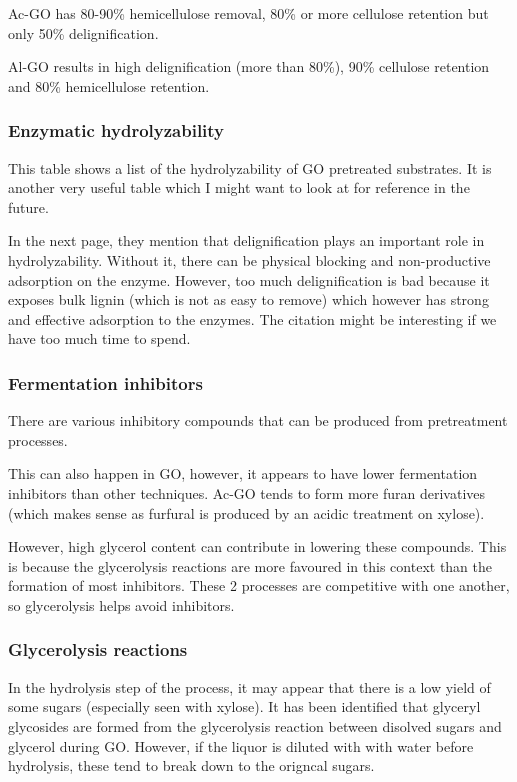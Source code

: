 \documentclass[11pt]{article}
\begin{document}
Ac-GO has 80-90\% hemicellulose removal, 80\% or more cellulose retention but only 50\% delignification.

Al-GO results in high delignification (more than 80\%), 90\% cellulose retention and 80\% hemicellulose retention.
\subsubsection{Enzymatic hydrolyzability}
\label{sec:org2b78a0d}
This table shows a list of the hydrolyzability of GO pretreated substrates. It is another very useful table which I might want to look at for reference in the future.

In the next page, they mention that delignification plays an important role in hydrolyzability. Without it, there can be physical blocking and non-productive adsorption on the enzyme. However, too much delignification is bad because it exposes bulk lignin (which is not as easy to remove) which however has strong and effective adsorption to the enzymes. The citation might be interesting if we have too much time to spend.
\subsubsection{Fermentation inhibitors}
\label{sec:orgf32981b}
There are various inhibitory compounds that can be produced from pretreatment processes.

This can also happen in GO, however, it appears to have lower fermentation inhibitors than other techniques. Ac-GO tends to form more furan derivatives (which makes sense as furfural is produced by an acidic treatment on xylose).

However, high glycerol content can contribute in lowering these compounds. This is because the glycerolysis reactions are more favoured in this context than the formation of most inhibitors. These 2 processes are competitive with one another, so glycerolysis helps avoid inhibitors. 
\subsubsection{Glycerolysis reactions}
\label{sec:org07eb206}
In the hydrolysis step of the process, it may appear that there is a low yield of some sugars (especially seen with xylose). It has been identified that glyceryl glycosides are formed from the glycerolysis reaction between disolved sugars and glycerol during GO. However, if the liquor is diluted with with water before hydrolysis, these tend to break down to the origncal sugars.
\end{document}
